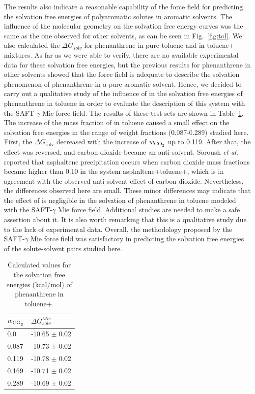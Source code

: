 \documentclass[preprint]{elsarticle}
\begin{document}
	The results also indicate a reasonable capability of the force field for predicting the solvation free energies of polyaromatic solutes in aromatic solvents. The influence of the molecular geometry on the solvation free energy curves was the same as the one observed for other solvents, as can be seen in Fig.~\ref{fig:tol}. We also calculated the $\Delta G_{solv}$ for phenanthrene in pure toluene and in toluene+ mixtures. As far as we were able to verify, there are no available experimental data for these solvation free energies, but the previous results for phenanthrene in other solvents showed that the force field is adequate to describe the solvation phenomenon of phenanthrene in a pure aromatic solvent. Hence, we decided to carry out a qualitative study of the influence of  in the solvation free energies of phenanthrene in toluene in order to evaluate the description of this system with the SAFT-$\gamma$ Mie force field. The results of these test sets are shown in Table~\ref{tbl:solvco2}. The increase of the mass fraction of  in toluene caused a small effect on the solvation free energies in the range of weight fractions (0.087-0.289) studied here. First, the $\Delta G_\text{solv}$ decreased with the increase of $w_\text{\ce{CO_2}}$ up to 0.119. After that, the effect was reversed, and carbon dioxide became an anti-solvent. Soroush \textit{et al}. \cite{SOROUSH2014405} reported that asphaltene precipitation occurs when carbon dioxide mass fractions became higher than 0.10 in the system asphaltene+toluene+, which is in agreement with the observed anti-solvent effect of carbon dioxide. Nevertheless, the differences observed here are small. These minor differences may indicate that the effect of  is negligible in the solvation of phenanthrene in toluene modeled with the SAFT-$\gamma$ Mie force field. Additional studies are needed to make a safe assertion about it. It is also worth remarking that this is a qualitative study due to the lack of experimental data. Overall, the methodology proposed by the SAFT-$\gamma$ Mie force field was satisfactory in predicting the solvation free energies of the solute-solvent pairs studied here.
	
	\begin{table}
		\centering
		\caption{Calculated values for the solvation free energies (kcal/mol) of phenanthrene in toluene+.}
		\label{tbl:solvco2}
		\begin{tabular}{ll}
			\hline\hline
			$w_\text{\ce{CO_2}}$ & $\Delta G_{solv}^{Mie}$ \\ \hline
			0.0          & -10.65 $\pm$ 0.02       \\
			0.087        & -10.73 $\pm$ 0.02       \\
			0.119        & -10.78 $\pm$ 0.02       \\
			0.169        & -10.71 $\pm$ 0.02       \\
			0.289        & -10.69 $\pm$ 0.02       \\ \hline\hline
		\end{tabular}
	\end{table}
	
\end{document}
